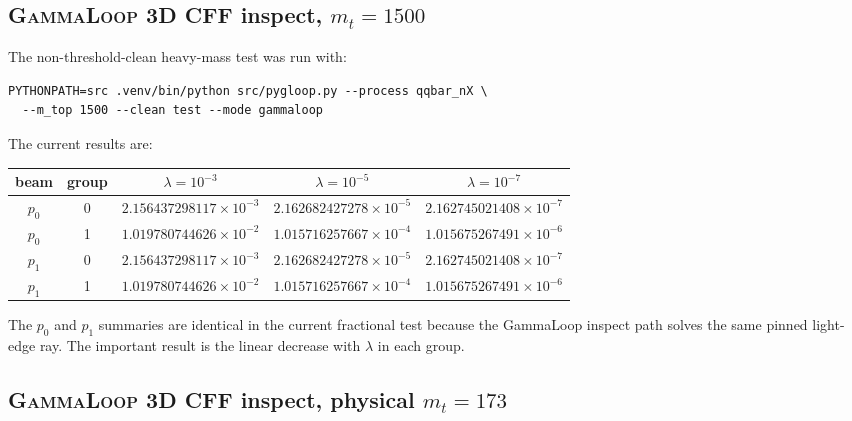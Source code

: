 \documentclass[11pt]{article}
\newcommand{\GammaLoop}{\textsc{GammaLoop}}
\begin{document}
\subsection[GammaLoop 3D CFF inspect, mt = 1500]{\GammaLoop{} 3D CFF inspect, \(m_t=1500\)}

The non-threshold-clean heavy-mass test was run with:
\begin{lstlisting}
PYTHONPATH=src .venv/bin/python src/pygloop.py --process qqbar_nX \
  --m_top 1500 --clean test --mode gammaloop
\end{lstlisting}
The current results are:
\begin{center}
\begin{tabular}{ccccc}
\toprule
beam & group & \(\lambda=10^{-3}\) & \(\lambda=10^{-5}\) & \(\lambda=10^{-7}\)\\
\midrule
\(p_0\) & 0 & \(2.156437298117\times10^{-3}\) & \(2.162682427278\times10^{-5}\) & \(2.162745021408\times10^{-7}\)\\
\(p_0\) & 1 & \(1.019780744626\times10^{-2}\) & \(1.015716257667\times10^{-4}\) & \(1.015675267491\times10^{-6}\)\\
\(p_1\) & 0 & \(2.156437298117\times10^{-3}\) & \(2.162682427278\times10^{-5}\) & \(2.162745021408\times10^{-7}\)\\
\(p_1\) & 1 & \(1.019780744626\times10^{-2}\) & \(1.015716257667\times10^{-4}\) & \(1.015675267491\times10^{-6}\)\\
\bottomrule
\end{tabular}
\end{center}
The \(p_0\) and \(p_1\) summaries are identical in the current fractional
test because the GammaLoop inspect path solves the same pinned light-edge ray.
The important result is the linear decrease with \(\lambda\) in each group.

\subsection[GammaLoop 3D CFF inspect, physical mt = 173]{\GammaLoop{} 3D CFF inspect, physical \(m_t=173\)}
\end{document}
